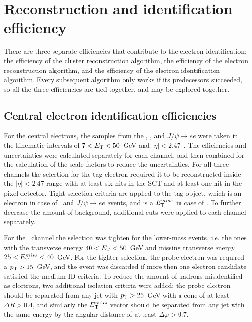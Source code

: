 \section{Reconstruction and identification efficiency}

There are three separate efficiencies that contribute to the electron identification: the efficiency of the cluster reconstruction algorithm, the efficiency of the electron reconstruction algorithm, and the efficiency of the electron identification algorithm. Every subsequent algorithm only works if its predecessors succeeded, so all the three efficiencies are tied together, and may be explored together.

\subsection{Central electron identification efficiencies}

For the central electrons, the samples from the \Zee, \Wenu, and $J/\psi \to ee$ were taken in the kinematic intervals of $7 < E_{\mathrm{T}} < 50$~GeV and $|\eta| < 2.47$~\cite{lib:elec_reco}. The efficiencies and uncertainties were calculated separately for each channel, and then combined for the calculation of the scale factors to reduce the uncertainties. For all three channels the selection for the tag electron required it to be reconstructed inside the $|\eta| < 2.47$ range with at least six hits in the SCT and at least one hit in the pixel detector. Tight selection criteria are applied to the tag object, which is an electron in case of \Zee\ and $J/\psi \to ee$ events, and is a $E_{\mathrm{T}}^{miss}$ in case of \Wenu. To further decrease the amount of background, additional cuts were applied to each channel separately.

For the \Wenu\ channel the selection was tighten for the lower-mass events, i.e. the ones with the transverse energy $40 < E_{\mathrm{T}} < 50$~GeV and missing transverse energy $25 < E_{\mathrm{T}}^{miss} < 40$~GeV. For the tighter selection, the probe electron was required a $p_{\mathrm{T}} > 15$~GeV, and the event was discarded if more then one electron candidate satisfied the medium ID criteria. To reduce the amount of hadrons misidentified as electrons, two additional isolation criteria were added: the probe electron should be separated from any jet with $p_{\mathrm{T}} > 25$~GeV with a cone of at least $\Delta R > 0.4$, and similarly the $E_{\mathrm{T}}^{miss}$ vector should be separated from any jet with the same energy by the angular distance of at least $\Delta \varphi > 0.7$.


